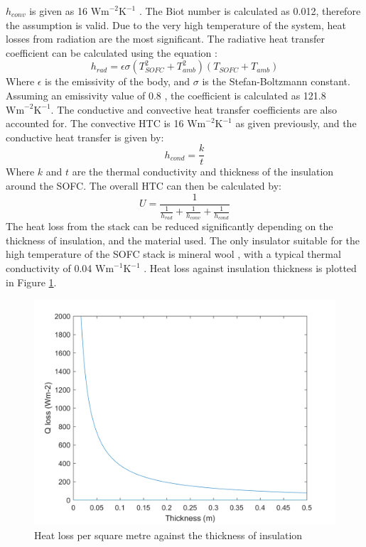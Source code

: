 $h_{conv}$ is given as 16 $\text{Wm}^{-2} \text{K}^{-1}$ \cite{LM7}. The Biot number is calculated as 0.012, therefore the assumption is valid. Due to the very high temperature of the system, heat losses from radiation are the most significant. The radiative heat transfer coefficient can be calculated using the equation \cite{LM13}:
\begin{equation}
h_{rad}= \epsilon \sigma (T_{SOFC}^2 + T_{amb}^2)(T_{SOFC}+ T_{amb}) 			
 \end{equation}
Where $\epsilon$ is the emissivity of the body, and $\sigma$ is the Stefan-Boltzmann constant. Assuming an emissivity value of 0.8 \cite{LM7}, the coefficient is calculated as 121.8 $\text{Wm}^{-2}\text{K}^{-1}$. The conductive and convective heat transfer coefficients are also accounted for. The convective HTC is 16 $\text{Wm}^{-2}\text{K}^{-1}$ as given previously, and the conductive heat transfer is given by:
\begin{equation}
 h_{cond}=\frac{k}{t}						
  \end{equation}
Where $k$ and $t$ are the thermal conductivity and thickness of the insulation around the SOFC. The overall HTC can then be calculated by:
\begin{equation}
 U=  \frac{1}{\frac{1}{h_{rad}} + \frac{1}{h_{conv}} + \frac{1}{h_{cond}} }			
\end{equation}
The heat loss from the stack can be reduced significantly depending on the thickness of insulation, and the material used. The only insulator suitable for the high temperature of the SOFC stack is mineral wool \cite{LM15}, with a typical thermal conductivity of 0.04 $\text{Wm}^{-1}\text{K}^{-1}$ \cite{LM14}. Heat loss against insulation thickness is plotted in Figure \ref{LMfig:insulation}.
\begin{figure}[h]
    \centering
    \includegraphics[scale=0.25]{insulation_thickness.png}
    \caption{Heat loss per square metre against the thickness of insulation}
    \label{LMfig:insulation}
\end{figure}

